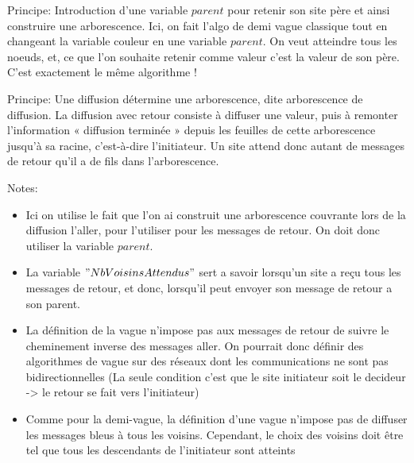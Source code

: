 \documentclass[a4paper,11pt]{article}
\begin{document}

Principe: Introduction d’une variable $parent$ pour retenir son site père et ainsi construire une arborescence. Ici, on fait l’algo de demi vague classique tout en changeant la variable couleur en une variable $parent$. On veut atteindre tous les noeuds, et, ce que l’on souhaite retenir comme valeur c’est la valeur de son père. C’est exactement le même algorithme !



\newpage
Principe: Une diffusion détermine une arborescence, dite arborescence de diffusion. La diffusion avec retour consiste à diffuser une valeur, puis à remonter l’information « diffusion terminée » depuis les feuilles de cette arborescence jusqu’à sa racine, c’est-à-dire l’initiateur. Un site attend donc autant de messages de retour qu’il a de fils dans l’arborescence.

Notes:
\begin{itemize}
    \item Ici on utilise le fait que l'on ai construit une arborescence couvrante lors de la diffusion l'aller, pour l'utiliser pour les messages de retour. On doit donc utiliser la variable $parent$.
    \item La variable $"NbVoisinsAttendus"$ sert a savoir lorsqu’un site a reçu tous les messages de retour, et donc, lorsqu’il peut envoyer son message de retour a son parent.
    \item La définition de la vague n’impose pas aux messages de retour de suivre le cheminement inverse des messages aller. On pourrait donc définir des algorithmes de vague sur des réseaux dont les communications ne sont pas bidirectionnelles (La seule condition c'est que le site initiateur soit le decideur -> le retour se fait vers l'initiateur)
    \item Comme pour la demi-vague, la définition d’une vague n’impose pas de diffuser les messages bleus à tous les voisins. Cependant, le choix des voisins doit être tel que tous les descendants de l’initiateur sont atteints
\end{itemize}
\end{document}
